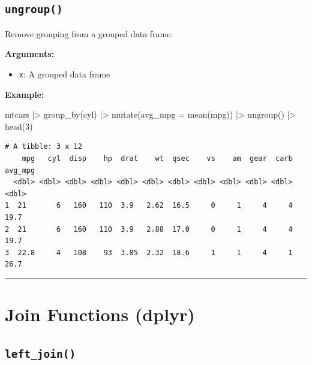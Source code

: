 \documentclass[
  letterpaper,
  DIV=11,
  numbers=noendperiod]{scrreprt}
\newenvironment{Shaded}{\begin{snugshade}}{\end{snugshade}}
\newcommand{\AttributeTok}[1]{\textcolor[rgb]{0.40,0.45,0.13}{#1}}
\newcommand{\DecValTok}[1]{\textcolor[rgb]{0.68,0.00,0.00}{#1}}
\newcommand{\FunctionTok}[1]{\textcolor[rgb]{0.28,0.35,0.67}{#1}}
\newcommand{\NormalTok}[1]{\textcolor[rgb]{0.00,0.23,0.31}{#1}}
\newcommand{\SpecialCharTok}[1]{\textcolor[rgb]{0.37,0.37,0.37}{#1}}
\providecommand{\tightlist}{%
  \setlength{\itemsep}{0pt}\setlength{\parskip}{0pt}}
\begin{document}
\subsection{\texorpdfstring{\texttt{ungroup()}}{ungroup()}}\label{ungroup}

Remove grouping from a grouped data frame.

\textbf{Arguments:}

\begin{itemize}
\tightlist
\item
  \texttt{x}: A grouped data frame
\end{itemize}

\textbf{Example:}

\begin{Shaded}
\begin{Highlighting}[]
\NormalTok{mtcars }\SpecialCharTok{|\textgreater{}}
  \FunctionTok{group\_by}\NormalTok{(cyl) }\SpecialCharTok{|\textgreater{}}
  \FunctionTok{mutate}\NormalTok{(}\AttributeTok{avg\_mpg =} \FunctionTok{mean}\NormalTok{(mpg)) }\SpecialCharTok{|\textgreater{}}
  \FunctionTok{ungroup}\NormalTok{() }\SpecialCharTok{|\textgreater{}}
  \FunctionTok{head}\NormalTok{(}\DecValTok{3}\NormalTok{)}
\end{Highlighting}
\end{Shaded}

\begin{verbatim}
# A tibble: 3 x 12
    mpg   cyl  disp    hp  drat    wt  qsec    vs    am  gear  carb avg_mpg
  <dbl> <dbl> <dbl> <dbl> <dbl> <dbl> <dbl> <dbl> <dbl> <dbl> <dbl>   <dbl>
1  21       6   160   110  3.9   2.62  16.5     0     1     4     4    19.7
2  21       6   160   110  3.9   2.88  17.0     0     1     4     4    19.7
3  22.8     4   108    93  3.85  2.32  18.6     1     1     4     1    26.7
\end{verbatim}

\begin{center}\rule{0.5\linewidth}{0.5pt}\end{center}

\section{Join Functions (dplyr)}\label{join-functions-dplyr}

\subsection{\texorpdfstring{\texttt{left\_join()}}{left\_join()}}\label{left_join-1}
\end{document}
